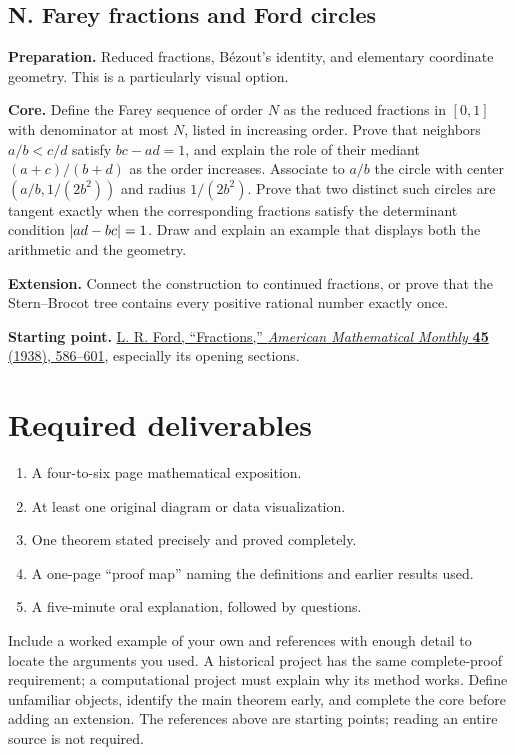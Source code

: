 \begin{capstoneproject}
\subsection*{N. Farey fractions and Ford circles}
\textbf{Preparation.} Reduced fractions, B\'ezout's identity, and
elementary coordinate geometry. This is a particularly visual option.

\textbf{Core.} Define the Farey sequence of order $N$ as the reduced
fractions in $[0,1]$ with denominator at most $N$, listed in increasing
order. Prove that neighbors $a/b<c/d$ satisfy $bc-ad=1$, and explain
the role of their mediant $(a+c)/(b+d)$ as the order increases.
Associate to $a/b$ the circle with center $(a/b,1/(2b^2))$ and radius
$1/(2b^2)$. Prove that two distinct such circles are tangent exactly
when the corresponding fractions satisfy the determinant condition
$\left|ad-bc\right|=1$. Draw and explain an example that displays both the
arithmetic and the geometry.

\textbf{Extension.} Connect the construction to continued fractions,
or prove that the Stern--Brocot tree contains every positive rational
number exactly once.

\textbf{Starting point.}
\href{https://www.maths.ed.ac.uk/~v1ranick/papers/ford.pdf}{L. R. Ford,
``Fractions,'' \emph{American Mathematical Monthly} \textbf{45}
(1938), 586--601}, especially its opening sections.

\end{capstoneproject}

\section{Required deliverables}

\begin{enumerate}
  \item A four-to-six page mathematical exposition.
  \item At least one original diagram or data visualization.
  \item One theorem stated precisely and proved completely.
  \item A one-page ``proof map'' naming the definitions and earlier results used.
  \item A five-minute oral explanation, followed by questions.
\end{enumerate}

Include a worked example of your own and references with enough detail
to locate the arguments you used. A historical project has the same
complete-proof requirement; a computational project must explain why
its method works. Define unfamiliar objects, identify the main theorem
early, and complete the core before adding an extension. The references
above are starting points; reading an entire source is not required.

